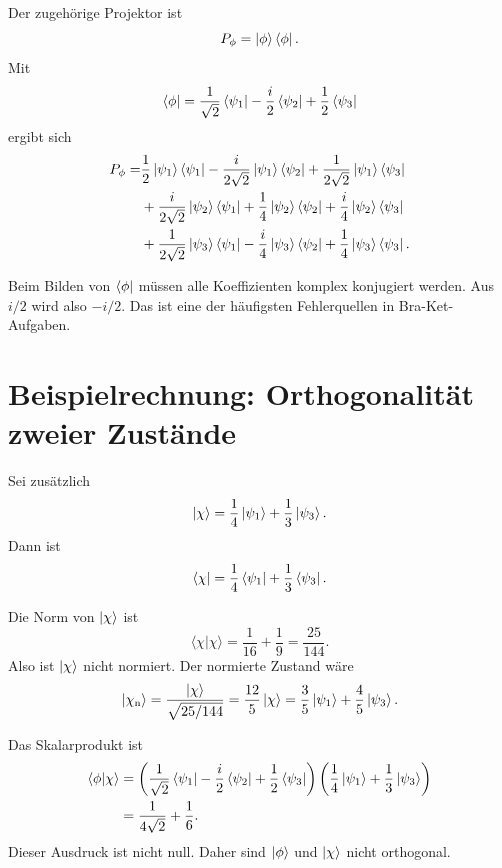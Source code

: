 Der zugehörige Projektor ist
\[
    P_\phi=\left|\phi\right\rangle\left\langle\phi\right|.
\]
Mit
\[
    \left\langle\phi\right|=\frac{1}{\sqrt2}\left\langle\psi_1\right|-\frac{i}{2}\left\langle\psi_2\right|+\frac12\left\langle\psi_3\right|
\]
ergibt sich
\[
\begin{aligned}
    P_\phi
    =&\frac12\left|\psi_1\right\rangle\left\langle\psi_1\right|
    -\frac{i}{2\sqrt2}\left|\psi_1\right\rangle\left\langle\psi_2\right|
    +\frac{1}{2\sqrt2}\left|\psi_1\right\rangle\left\langle\psi_3\right| \\
    &+\frac{i}{2\sqrt2}\left|\psi_2\right\rangle\left\langle\psi_1\right|
    +\frac14\left|\psi_2\right\rangle\left\langle\psi_2\right|
    +\frac{i}{4}\left|\psi_2\right\rangle\left\langle\psi_3\right| \\
    &+\frac{1}{2\sqrt2}\left|\psi_3\right\rangle\left\langle\psi_1\right|
    -\frac{i}{4}\left|\psi_3\right\rangle\left\langle\psi_2\right|
    +\frac14\left|\psi_3\right\rangle\left\langle\psi_3\right|.
\end{aligned}
\]

\begin{notebox}
Beim Bilden von $\left\langle\phi\right|$ müssen alle Koeffizienten komplex konjugiert werden. Aus $i/2$ wird also $-i/2$. Das ist eine der häufigsten Fehlerquellen in Bra-Ket-Aufgaben.
\end{notebox}

\section{Beispielrechnung: Orthogonalität zweier Zustände}

Sei zusätzlich
\[
    \left|\chi\right\rangle=\frac14\left|\psi_1\right\rangle+\frac13\left|\psi_3\right\rangle.
\]
Dann ist
\[
    \left\langle\chi\right|=\frac14\left\langle\psi_1\right|+\frac13\left\langle\psi_3\right|.
\]

\begin{calculationbox}
Die Norm von $\left|\chi\right\rangle$ ist
\[
    \langle\chi|\chi\rangle
    =\frac1{16}+\frac1{9}
    =\frac{25}{144}.
\]
Also ist $\left|\chi\right\rangle$ nicht normiert. Der normierte Zustand wäre
\[
    \left|\chi_{\mathrm n}\right\rangle
    =\frac{\left|\chi\right\rangle}{\sqrt{25/144}}
    =\frac{12}{5}\left|\chi\right\rangle
    =\frac35\left|\psi_1\right\rangle+\frac45\left|\psi_3\right\rangle.
\]
\end{calculationbox}

\begin{calculationbox}
Das Skalarprodukt ist
\[
\begin{aligned}
    \langle\phi|\chi\rangle
    &=\left(\frac{1}{\sqrt2}\left\langle\psi_1\right|-\frac{i}{2}\left\langle\psi_2\right|+\frac12\left\langle\psi_3\right|\right)
      \left(\frac14\left|\psi_1\right\rangle+\frac13\left|\psi_3\right\rangle\right) \\
    &=\frac{1}{4\sqrt2}+\frac16.
\end{aligned}
\]
Dieser Ausdruck ist nicht null. Daher sind $\left|\phi\right\rangle$ und $\left|\chi\right\rangle$ nicht orthogonal.
\end{calculationbox}

